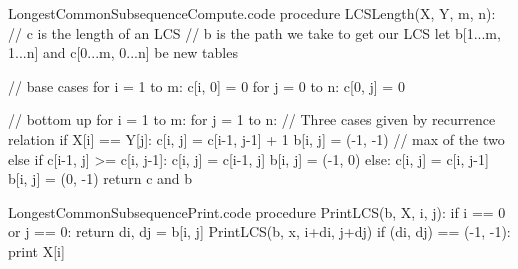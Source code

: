\documentclass[a4paper]{article}
\begin{document}
\begin{filecontents*}[overwrite]{LongestCommonSubsequenceCompute.code}
procedure LCSLength(X, Y, m, n):
    // c is the length of an LCS
    // b is the path we take to get our LCS
    let b[1...m, 1...n] and c[0...m, 0...n] be new tables

    // base cases
    for i = 1 to m:
        c[i, 0] = 0
    for j = 0 to n:
        c[0, j] = 0

    // bottom up
    for i = 1 to m:
        for j = 1 to n:
            // Three cases given by recurrence relation
            if X[i] == Y[j]:
                c[i, j] = c[i-1, j-1] + 1
                b[i, j] = (-1, -1)
            // max of the two
            else if c[i-1, j] >= c[i, j-1]:
                c[i, j] = c[i-1, j]
                b[i, j] = (-1, 0)
            else:
                c[i, j] = c[i, j-1]
                b[i, j] = (0, -1)
    return c and b                
\end{filecontents*}

\begin{filecontents*}[overwrite]{LongestCommonSubsequencePrint.code}
procedure PrintLCS(b, X, i, j):
    if i == 0 or j == 0:
        return
    di, dj = b[i, j]
    PrintLCS(b, x, i+di, j+dj)
    if (di, dj) == (-1, -1):
        print X[i]
\end{filecontents*}
\end{document}
